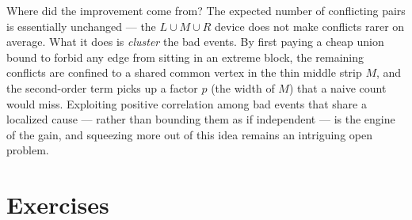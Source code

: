 \begin{insight}
Where did the improvement come from? The expected number of conflicting pairs
is essentially unchanged --- the $L\cup M\cup R$ device does not make conflicts
rarer on average. What it does is \emph{cluster} the bad events. By first paying
a cheap union bound to forbid any edge from sitting in an extreme block, the
remaining conflicts are confined to a shared common vertex in the thin middle
strip $M$, and the second-order term picks up a factor $p$ (the width of $M$)
that a naive count would miss. Exploiting positive correlation among bad events
that share a localized cause --- rather than bounding them as if independent ---
is the engine of the gain, and squeezing more out of this idea remains an
intriguing open problem.
\end{insight}

\section*{Exercises}

